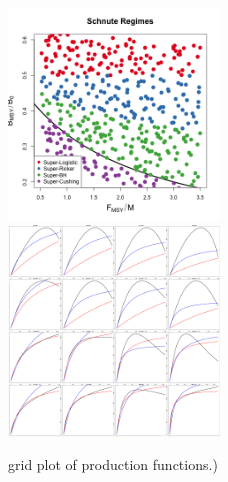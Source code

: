\documentclass[12pt]{article}
\begin{document}
%
\begin{figure}[h!]
\includegraphics[width=0.5\textwidth]{../gpBias/designLineColorHHardFlatT30N150WWideN112.png}
\includegraphics[width=0.5\textwidth]{../gpBias/rGridHHardFlatT30N150WWideN112.png}
\caption{\color{red} grid plot of production functions.)}
\end{figure}



%
%
\end{document}
